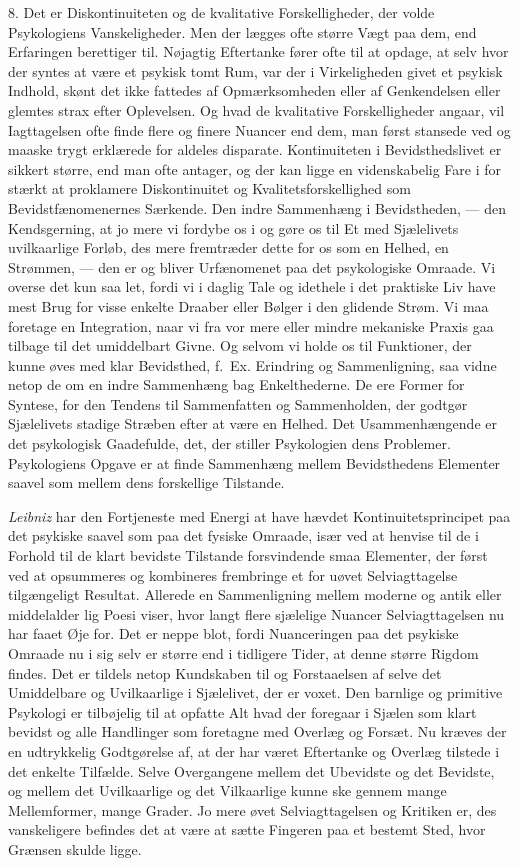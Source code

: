 \documentclass[12pt,a4paper]{book}
\newcommand{\opage}[1]{\marginnote{\footnotesize\textit{[#1]}}}
\newcommand{\apage}[1]{\marginnote{\footnotesize\textit{[#1]}}}
\begin{document}
8. Det er Diskontinuiteten og de kvalitative Forskelligheder, der
volde Psykologiens Vanskeligheder. Men der lægges ofte større Vægt paa
dem, end Erfaringen berettiger til. Nøjagtig Eftertanke fører ofte til
at opdage, at selv hvor der syntes at være et \apage{28} psykisk tomt Rum, var
der i Virkeligheden givet et psykisk Indhold, skønt det ikke fattedes
af Opmærksomheden eller af Genkendelsen eller glemtes strax efter
Oplevelsen. Og hvad de kvalitative Forskelligheder angaar, vil
Iagttagelsen ofte finde flere og finere Nuancer end dem, man først
stansede ved og maaske trygt erklærede for aldeles disparate.
Kontinuiteten i Bevidsthedslivet er sikkert større, end man ofte
antager, og der kan ligge en videnskabelig Fare i for stærkt at
proklamere Diskontinuitet og Kvalitetsforskellighed som
Bevidstfænomenernes Særkende. Den indre Sammenhæng i Bevidstheden, ---
den Kendsgerning, at jo mere vi fordybe os i og gøre os til Et med
Sjælelivets uvilkaarlige Forløb, des mere fremtræder dette for os som
en Helhed, en Strømmen, --- den er og bliver Urfænomenet paa det
psykologiske Omraade. Vi overse det kun saa let, fordi vi i daglig
Tale og idethele i det praktiske Liv have mest Brug for visse enkelte
Draaber eller Bølger i den glidende Strøm. Vi maa foretage en
Integration, naar vi fra vor mere eller mindre mekaniske Praxis gaa
tilbage til det umiddelbart Givne. Og selvom vi holde os til
Funktioner, der kunne øves med klar Bevidsthed, f.\ Ex. Erindring og
Sammenligning, saa vidne netop de om en indre Sammenhæng bag
Enkelthederne. De ere Former for Syntese, for den Tendens til
Sammenfatten og Sammenholden, der godtgør Sjælelivets stadige Stræben
efter at være en Helhed. Det Usammenhængende er det psykologisk
Gaadefulde, det, der stiller Psykologien dens Problemer. Psykologiens
Opgave er at finde Sammenhæng mellem Bevidsthedens Elementer saavel som
mellem dens forskellige Tilstande.

\emph{Leibniz} har den Fortjeneste med Energi at have hævdet
Kontinuitetsprincipet paa det psykiske saavel som paa det fysiske
Omraade, især ved at henvise til de i Forhold til de klart bevidste
Tilstande forsvindende smaa Elementer, der først ved at opsummeres og
kombineres frembringe et for uøvet Selviagttagelse tilgængeligt
Resultat. Allerede en Sammenligning mellem moderne og antik eller
middelalder%
\opage{29}lig Poesi viser, hvor langt flere sjælelige Nuancer
Selviagttagelsen nu har faaet Øje for. Det er neppe blot, fordi
Nuanceringen paa det psykiske Omraade nu i sig selv er større end i
tidligere Tider, at denne større Rigdom findes. Det er tildels netop
Kundskaben til og Forstaaelsen af selve det Umiddelbare og
Uvilkaarlige i Sjælelivet, der er voxet. Den barnlige og primitive
Psykologi er tilbøjelig til at opfatte Alt hvad der foregaar i Sjælen
som klart bevidst og alle Handlinger som foretagne med Overlæg og
Forsæt. Nu kræves der en udtrykkelig Godtgørelse af, at der har været
Eftertanke og Overlæg tilstede i det enkelte Tilfælde. Selve
Overgangene mellem det Ubevidste og det Bevidste, og mellem det
Uvilkaarlige og det Vilkaarlige kunne ske gennem mange Mellemformer,
mange Grader. Jo mere øvet Selviagttagelsen og Kritiken er, des
vanskeligere befindes det at være at sætte Fingeren paa et bestemt
Sted, hvor Grænsen skulde ligge.
\end{document}
